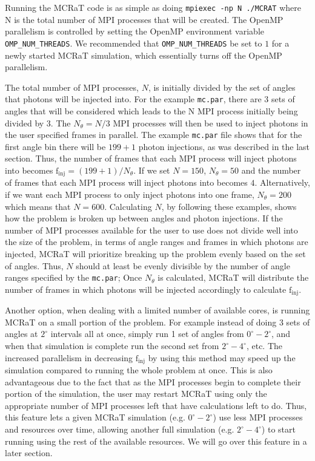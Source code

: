 \documentclass[12pt,a4paper]{article}
\begin{document}
Running the MCRaT code is as simple as doing \texttt{mpiexec -np N ./MCRAT} where N is the total number of MPI processes that will be created. The OpenMP parallelism is controlled by setting the OpenMP environment variable \texttt{OMP\_NUM\_THREADS}. We recommended that \texttt{OMP\_NUM\_THREADS} be set to $1$ for a newly started MCRaT simulation, which essentially turns off the OpenMP parallelism. 

 The total number of MPI processes, $N$, is initially divided by the set of angles that photons will be injected into. For the example \texttt{mc.par}, there are $3$ sets of angles that will be considered which leads to the N MPI process initially being divided by 3. The $N_\theta=N/3$ MPI processes will then be used to inject photons in the user specified frames in parallel. The example \texttt{mc.par} file shows that for the first angle bin there will be $199+1$ photon injections, as was described in the last section. Thus, the number of frames that each MPI process will inject photons into becomes $\mathrm{f_{inj}}=(199+1)/N_\theta$. If we set $N=150$, $N_\theta=50$ and the number of frames that each MPI process will inject photons into becomes $4$. Alternatively, if we want each MPI process to only inject photons into one frame, $N_\theta=200$ which means that $N=600$. Calculating $N$, by following these examples, shows how the problem is broken up between angles and photon injections. If the number of MPI processes available for the user to use does not divide well into the size of the problem, in terms of angle ranges and frames in which photons are injected, MCRaT will prioritize breaking up the problem evenly based on the set of angles. Thus, $N$ should at least be evenly divisible by the number of angle ranges specified by the \texttt{mc.par}; Once $N_\theta$ is calculated, MCRaT will distribute the number of frames in which photons will be injected accordingly to calculate $\mathrm{f_{inj}}$.
 
 Another option, when dealing with a limited number of available cores, is running MCRaT on a small portion of the problem. For example instead of doing 3 sets of angles at $2^\circ$ intervals all at once, simply run 1 set of angles from $0^\circ-2^\circ$, and when that simulation is complete run the second set from $2^\circ-4^\circ$, etc. The increased parallelism in decreasing $\mathrm{f_{inj}}$ by using this method may speed up the simulation compared to running the whole problem at once. This is also advantageous due to the fact that as the MPI processes begin to complete their portion of the simulation, the user may restart MCRaT using only the appropriate number of MPI processes left that have calculations left to do. Thus, this feature lets a given MCRaT simulation (e.g. $0^\circ-2^\circ$) use less MPI processes and resources over time, allowing another full simulation (e.g. $2^\circ-4^\circ$) to start running using the rest of the available resources. We will go over this feature in a later section.
 
\end{document}
